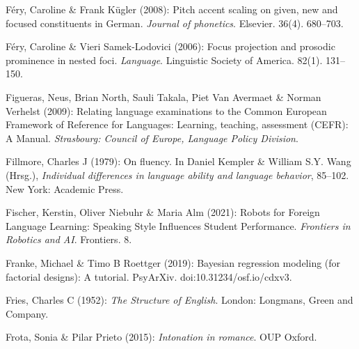 \begin{styleBibliography}
Féry, Caroline \& Frank Kügler (2008): Pitch accent scaling on given, new and focused constituents in German. \textit{Journal of phonetics}. Elsevier. 36(4). 680–703.
\end{styleBibliography}

\begin{styleBibliography}
Féry, Caroline \& Vieri Samek-Lodovici (2006): Focus projection and prosodic prominence in nested foci. \textit{Language}. Linguistic Society of America. 82(1). 131–150.
\end{styleBibliography}

\begin{styleBibliography}
Figueras, Neus, Brian North, Sauli Takala, Piet Van Avermaet \& Norman Verhelst (2009): Relating language examinations to the Common European Framework of Reference for Languages: Learning, teaching, assessment (CEFR): A Manual. \textit{Strasbourg: Council of Europe, Language Policy Division}.
\end{styleBibliography}

\begin{styleBibliography}
Fillmore, Charles J (1979): On fluency. In Daniel Kempler \& William S.Y. Wang (Hrsg.), \textit{Individual differences in language ability and language behavior}, 85–102. New York: Academic Press.
\end{styleBibliography}

\begin{styleBibliography}
Fischer, Kerstin, Oliver Niebuhr \& Maria Alm (2021): Robots for Foreign Language Learning: Speaking Style Influences Student Performance. \textit{Frontiers in Robotics and AI}. Frontiers. 8.
\end{styleBibliography}

\begin{styleBibliography}
Franke, Michael \& Timo B Roettger (2019): Bayesian regression modeling (for factorial designs): A tutorial. PsyArXiv. doi:10.31234/osf.io/cdxv3.
\end{styleBibliography}

\begin{styleBibliography}
Fries, Charles C (1952): \textit{The Structure of English}. London: Longmans, Green and Company.
\end{styleBibliography}

\begin{styleBibliography}
Frota, Sonia \& Pilar Prieto (2015): \textit{Intonation in romance}. OUP Oxford.
\end{styleBibliography}

